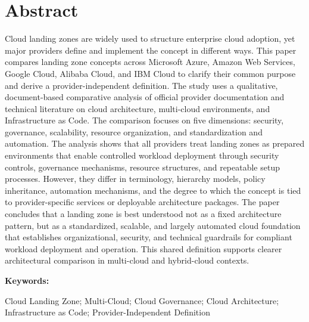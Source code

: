 \section*{Abstract}


Cloud landing zones are widely used to structure enterprise cloud adoption, yet major providers define and implement the concept in different ways. This paper compares landing zone concepts across Microsoft Azure, Amazon Web Services, Google Cloud, Alibaba Cloud, and IBM Cloud to clarify their common purpose and derive a provider-independent definition. The study uses a qualitative, document-based comparative analysis of official provider documentation and technical literature on cloud architecture, multi-cloud environments, and Infrastructure as Code. The comparison focuses on five dimensions: security, governance, scalability, resource organization, and standardization and automation. The analysis shows that all providers treat landing zones as prepared environments that enable controlled workload deployment through security controls, governance mechanisms, resource structures, and repeatable setup processes. However, they differ in terminology, hierarchy models, policy inheritance, automation mechanisms, and the degree to which the concept is tied to provider-specific services or deployable architecture packages. The paper concludes that a landing zone is best understood not as a fixed architecture pattern, but as a standardized, scalable, and largely automated cloud foundation that establishes organizational, security, and technical guardrails for compliant workload deployment and operation. This shared definition supports clearer architectural comparison in multi-cloud and hybrid-cloud contexts.


\vspace{2ex}
\textbf{Keywords:}

Cloud Landing Zone; Multi-Cloud; Cloud Governance; Cloud Architecture; Infrastructure as Code; Provider-Independent Definition